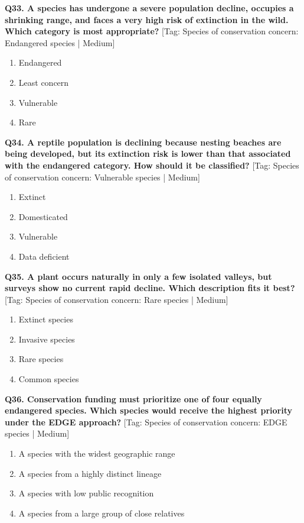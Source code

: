 \noindent\textbf{Q33. A species has undergone a severe population decline, occupies a shrinking range, and faces a very high risk of extinction in the wild. Which category is most appropriate?} \hfill [Tag: Species of conservation concern: Endangered species | Medium]
\begin{enumerate}[label=(\alph*),topsep=2pt,itemsep=1pt,partopsep=0pt,parsep=0pt]
    \item {Endangered}
    \item {Least concern}
    \item {Vulnerable}
    \item {Rare}
\end{enumerate}
\vspace{2mm}

\noindent\textbf{Q34. A reptile population is declining because nesting beaches are being developed, but its extinction risk is lower than that associated with the endangered category. How should it be classified?} \hfill [Tag: Species of conservation concern: Vulnerable species | Medium]
\begin{enumerate}[label=(\alph*),topsep=2pt,itemsep=1pt,partopsep=0pt,parsep=0pt]
    \item {Extinct}
    \item {Domesticated}
    \item {Vulnerable}
    \item {Data deficient}
\end{enumerate}
\vspace{2mm}

\noindent\textbf{Q35. A plant occurs naturally in only a few isolated valleys, but surveys show no current rapid decline. Which description fits it best?} \hfill [Tag: Species of conservation concern: Rare species | Medium]
\begin{enumerate}[label=(\alph*),topsep=2pt,itemsep=1pt,partopsep=0pt,parsep=0pt]
    \item {Extinct species}
    \item {Invasive species}
    \item {Rare species}
    \item {Common species}
\end{enumerate}
\vspace{2mm}

\noindent\textbf{Q36. Conservation funding must prioritize one of four equally endangered species. Which species would receive the highest priority under the EDGE approach?} \hfill [Tag: Species of conservation concern: EDGE species | Medium]
\begin{enumerate}[label=(\alph*),topsep=2pt,itemsep=1pt,partopsep=0pt,parsep=0pt]
    \item {A species with the widest geographic range}
    \item {A species from a highly distinct lineage}
    \item {A species with low public recognition}
    \item {A species from a large group of close relatives}
\end{enumerate}
\vspace{2mm}

